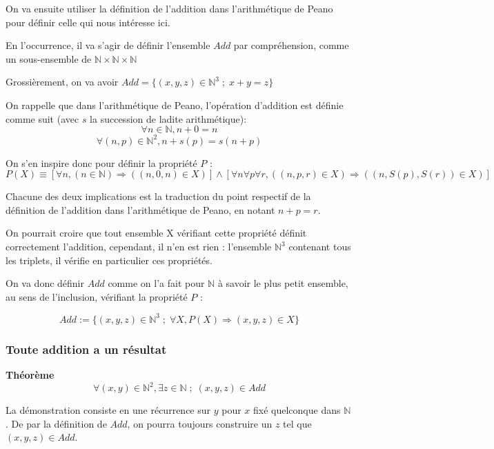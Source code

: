 \documentclass{article}
\begin{document}
On va ensuite utiliser la définition de l'addition dans l'arithmétique de Peano pour définir celle qui nous intéresse ici.

En l'occurrence, il va s'agir de définir l'ensemble $Add$ par compréhension, comme un sous-ensemble de $\mathbb{N} \times \mathbb{N} \times \mathbb{N}$

Grossièrement, on va avoir $Add = \{ (x,y,z) \in \mathbb{N}^3 \; ; \; x+y = z \}$

On rappelle que dans l'arithmétique de Peano, l'opération d'addition est définie comme suit (avec $s$ la succession de ladite arithmétique):
$$\forall n \in \mathbb{N}, n + 0 = n$$
$$\forall (n,p) \in \mathbb{N}^2, n + s(p) = s(n+p)$$

On s'en inspire donc pour définir la propriété $P$ :
$$P(X) \equiv [\forall n, (n \in \mathbb{N}) \Rightarrow ((n,0,n) \in X)] \wedge [\forall n \forall p \forall r, ((n,p,r) \in X) \Rightarrow ((n,S(p),S(r)) \in X)]$$

Chacune des deux implications est la traduction du point respectif de la définition de l'addition dans l'arithmétique de Peano, en notant $n+p = r$.

On pourrait croire que tout ensemble X vérifiant cette propriété définit correctement l'addition, cependant, il n'en est rien : l'ensemble $\mathbb{N}^3$ contenant tous les triplets, il vérifie en particulier ces propriétés.

On va donc définir $Add$ comme on l'a fait pour $\mathbb{N}$ à savoir le plus petit ensemble, au sens de l'inclusion, vérifiant la propriété $P$ :

$$Add := \{(x,y,z) \in \mathbb{N}^3 \; ; \; \forall X, P(X) \Rightarrow (x,y,z) \in X\}$$

\subsubsection{Toute addition a un résultat}

\textbf{Théorème}
$$\forall (x,y) \in \mathbb{N}^2, \exists z \in \mathbb{N} \; ; \; (x,y,z) \in Add$$

La démonstration consiste en une récurrence sur $y$ pour $x$ fixé quelconque dans $\mathbb{N}$. De par la définition de $Add$, on pourra toujours construire un $z$ tel que $(x,y,z) \in Add$.
\end{document}
